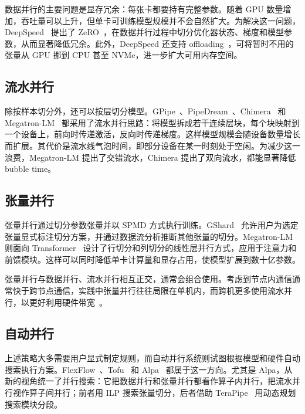 \documentclass[10pt,letterpaper,twocolumn]{article}
\begin{document}
数据并行的主要问题是显存冗余：每张卡都要持有完整参数。随着 GPU 数量增加，吞吐量可以上升，但单卡可训练模型规模并不会自然扩大。为解决这一问题，DeepSpeed~\cite{deepspeed} 提出了 ZeRO~\cite{rajbhandari2020zero}，在数据并行过程中切分优化器状态、梯度和模型参数，从而显著降低冗余。此外，DeepSpeed 还支持 offloading~\cite{zero-infinity}，可将暂时不用的张量从 GPU 挪到 CPU 甚至 NVMe，进一步扩大可用内存空间。

\subsection{流水并行}

除按样本切分外，还可以按层切分模型。GPipe~\cite{gpipe}、PipeDream~\cite{pipedream}、Chimera~\cite{chimera} 和 Megatron-LM~\cite{shoeybi2019megatron} 都采用了流水并行思路：将模型拆成若干连续层块，每个块映射到一个设备上，前向时传递激活，反向时传递梯度。这样模型规模会随设备数量增长而扩展。其代价是流水线气泡时间，即部分设备在某一时刻处于空闲。为减少这一浪费，Megatron-LM 提出了交错流水，Chimera 提出了双向流水，都能显著降低 bubble time。

\subsection{张量并行}

张量并行通过切分参数张量并以 SPMD 方式执行训练。GShard~\cite{gshard} 允许用户为选定张量显式标注切分方案，并通过数据流分析推断其他张量的切分。Megatron-LM~\cite{shoeybi2019megatron} 则面向 Transformer~\cite{transformer} 设计了行切分和列切分的线性层并行方式，应用于注意力和前馈模块。这样可以同时降低单卡计算量和显存占用，使模型扩展到数十亿参数。

张量并行与数据并行、流水并行相互正交，通常会组合使用。考虑到节点内通信通常快于跨节点通信，实践中张量并行往往局限在单机内，而跨机更多使用流水并行，以更好利用硬件带宽~\cite{shoeybi2019megatron}。

\subsection{自动并行}

上述策略大多需要用户显式制定规则，而自动并行系统则试图根据模型和硬件自动搜索执行方案。FlexFlow~\cite{flexflow}、Tofu~\cite{tofu} 和 Alpa~\cite{zheng2022alpa} 都属于这一方向。尤其是 Alpa，从新的视角统一了并行搜索：它把数据并行和张量并行都看作算子内并行，把流水并行视作算子间并行；前者用 ILP 搜索张量切分，后者借助 TeraPipe~\cite{terapipe} 用动态规划搜索模块分段。
\end{document}
